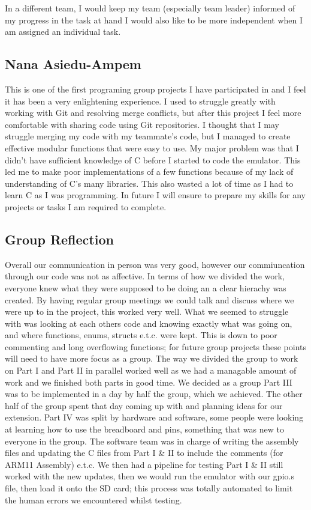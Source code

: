 \documentclass[11pt]{article}
\begin{document}
In a different team, I would keep my team (especially team leader) informed of
my progress in the task at hand I would also like to be more independent when I
am assigned an individual task.

\subsection{Nana Asiedu-Ampem}
This is one of the first programing group projects I have participated in and I feel it has been a very enlightening experience. I used to struggle greatly with working with Git and resolving merge conflicts, but after this project I feel more comfortable with sharing code using Git repositories. I thought that I may struggle merging my code with my teammate's code, but I managed to create effective modular functions that were easy to use. My major problem was that I didn't have sufficient knowledge of C before I started to code the emulator. This led me to make poor implementations of a few functions because of my lack of understanding of C's many libraries. This also wasted a lot of time as I had to learn C as I was programming. In future I will ensure to prepare my skills for any projects or tasks I am required to complete. \newline

\subsection{Group Reflection}

Overall our communication in person was very good, however our commiuncation through our code was not as affective. In terms of how we divided the work, everyone knew what they were supposed to be doing an a clear hierachy was created. By having regular group meetings we could talk and discuss where we were up to in the project, this worked very well. What we seemed to struggle with was looking at each others code and knowing exactly what was going on, and where functions, enums, structs e.t.c. were kept. This is down to poor commenting and long overflowing functions; for future group projects these points will need to have more focus as a group. The way we divided the group to work on Part I and Part II in parallel worked well as we had a managable amount of work and we finished both parts in good time. We decided as a group Part III was to be implemented in a day by half the group, which we achieved. The other half of the group spent that day coming up with and planning ideas for our extension. Part IV was split by hardware and software, some people were looking at learning how to use the breadboard and pins, something that was new to everyone in the group. The software team was in charge of writing the assembly files and updating the C files from Part I & II to include the comments (for ARM11 Assembly) e.t.c. We then had a pipeline for testing Part I & II still worked with the new updates, then we would run the emulator with our gpio.s file, then load it onto the SD card; this process was totally automated to limit the human errors we encountered whilst testing.
\end{document}

